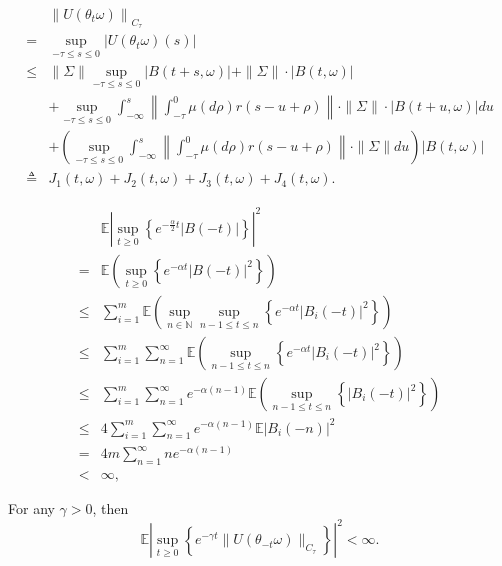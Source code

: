 \documentclass[10pt,a4paper]{amsart}
\begin{document}
\begin{align}\label{eq13}
&\left\|U(\theta_t\omega)\right\|_{C_\tau}\nonumber\\
=&\sup_{-\tau\leq s\leq0}\left|U(\theta_t\omega)(s)\right|\nonumber\\
\leq&\|\Sigma\|\sup_{-\tau\leq s\leq0}|B(t+s,\omega)|+\|\Sigma\|\cdot|B(t,\omega)|\nonumber\\
&+\sup_{-\tau\leq s\leq0}\int_{-\infty}^{s}\left\|\int_{-\tau}^0\mu(d\rho)r(s-u+\rho)\right\|\cdot\|\Sigma\|\cdot|B(t+u,\omega)|du\nonumber\\
&+\left(\sup_{-\tau\leq s\leq0}\int_{-\infty}^{s}\left\|\int_{-\tau}^0\mu(d\rho)r(s-u+\rho)\right\|\cdot\|\Sigma\|du\right)|B(t,\omega)|\nonumber\\
\triangleq&J_1(t,\omega)+J_2(t,\omega)+J_3(t,\omega)+J_4(t,\omega).
\end{align}

\begin{align}\label{eq20-8}
&\mathbb{E}\left|\sup_{t\geq0}\left\{e^{-\frac\alpha2t}|B(-t)|\right\}\right|^2\nonumber\\
=&\mathbb{E}\left(\sup_{t\geq0}\left\{e^{-\alpha t}|B(-t)|^2\right\}\right)\nonumber\\
\leq&\sum_{i=1}^m\mathbb{E}\left(\sup_{n\in\mathbb{N}}\sup_{n-1\leq t\leq n}\left\{e^{-\alpha t}|B_i(-t)|^2\right\}\right)\nonumber\\
\leq&\sum_{i=1}^m\sum_{n=1}^\infty\mathbb{E}\left(\sup_{n-1\leq t\leq n}\left\{e^{-\alpha t}|B_i(-t)|^2\right\}\right)\nonumber\\
\leq&\sum_{i=1}^m\sum_{n=1}^\infty e^{-\alpha(n-1)}\mathbb{E}\left(\sup_{n-1\leq t\leq n}\left\{|B_i(-t)|^2\right\}\right)\nonumber\\
\leq&4\sum_{i=1}^m\sum_{n=1}^\infty e^{-\alpha(n-1)}\mathbb{E}|B_i(-n)|^2\nonumber\\
=&4m\sum_{n=1}^\infty ne^{-\alpha(n-1)}\nonumber\\
<&\infty,
\end{align}

\begin{lemma}\label{lem5}
For any $\gamma>0$, then
\begin{equation}\label{eq49}
\mathbb{E}\left|\sup_{t\geq0}\left\{e^{-\gamma t}\|U(\theta_{-t}\omega)\|_{C_\tau}\right\}\right|^2<\infty.
\end{equation}
\end{lemma}
\end{document}
